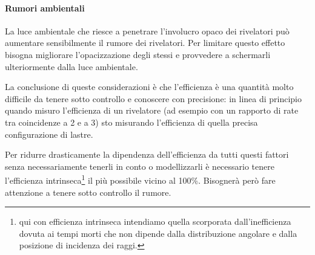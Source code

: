 \paragraph{Rumori ambientali}
La luce ambientale che riesce a penetrare l'involucro opaco dei rivelatori può aumentare sensibilmente il rumore dei rivelatori. Per limitare questo effetto bisogna migliorare l'opacizzazione degli stessi e provvedere a schermarli ulteriormente dalla luce ambientale.

La conclusione di queste considerazioni è che l'efficienza è una quantità molto difficile da tenere sotto controllo e conoscere con precisione: in linea di principio quando misuro l'efficienza di un rivelatore (ad esempio con un rapporto di rate tra coincidenze  a 2 e a 3) sto misurando l'efficienza di quella precisa configurazione di lastre.

Per ridurre drasticamente la dipendenza dell'efficienza da tutti questi fattori senza necessariamente tenerli in conto o modellizzarli è necessario tenere l'efficienza intrinseca\footnote{qui con efficienza intrinseca intendiamo quella scorporata dall'inefficienza dovuta ai tempi morti che non dipende dalla distribuzione angolare e dalla posizione di incidenza dei raggi.} il più possibile vicino al 100\%. Bisognerà però fare attenzione a tenere sotto controllo il rumore.
 
 
